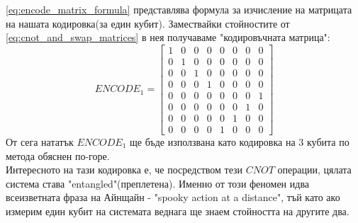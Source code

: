 \documentclass[11pt,oneside,a4paper]{article}
\begin{document}
\eqref{eq:encode_matrix_formula} представлява формула за изчисление на матрицата на нашата кодировка(за един кубит). Замествайки стойностите от \eqref{eq:cnot_and_swap_matrices} в нея получаваме "кодировъчната матрица":
\begin{equation} 
    ENCODE_1 = \begin{bmatrix}
    1 & 0 & 0 & 0 & 0 & 0 & 0 & 0\\
    0 & 1 & 0 & 0 & 0 & 0 & 0 & 0\\
    0 & 0 & 1 & 0 & 0 & 0 & 0 & 0\\
    0 & 0 & 0 & 1 & 0 & 0 & 0 & 0\\
    0 & 0 & 0 & 0 & 0 & 0 & 0 & 1\\
    0 & 0 & 0 & 0 & 0 & 0 & 1 & 0\\
    0 & 0 & 0 & 0 & 0 & 1 & 0 & 0\\
    0 & 0 & 0 & 0 & 1 & 0 & 0 & 0
    \end{bmatrix}
    \label{eq:encode_matrix_res}
\end{equation}
От сега нататък $ENCODE_1$ ще бъде използвана като кодировка на 3 кубита по метода обяснен по-горе.\\
Интересното на тази кодировка е, че посредством тези $CNOT$ операции, цялата система става "entangled"(преплетена). Именно от този феномен идва всеизветната фраза на Айнщайн - "spooky action at a distance", тъй като ако измерим един кубит на системата веднага ще знаем стойността на другите два. \cite{AE-MB-letters}
\end{document}
